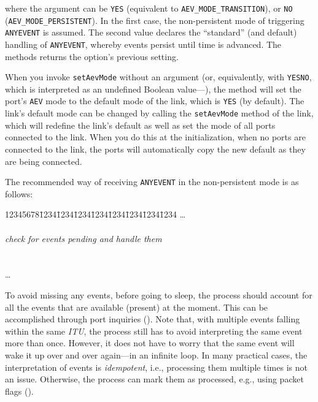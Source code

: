 \noindent
where the argument can be {\tt YES} (equivalent to
{\tt AEV\_MODE\_TRANSITION}), or
{\tt NO} ({\tt AEV\_MODE\_PERSISTENT}).
In the first case, the non-persistent mode of triggering {\tt ANYEVENT} is
assumed.
The second value declares the ``standard'' (and default) handling of
{\tt ANYEVENT}, whereby events persist until time is advanced.
The methods returns the option's previous setting.

When you invoke {\tt setAevMode} without an argument (or, equivalently, with
{\tt YESNO}, which is interpreted as an undefined Boolean
value---), the method
will set the port's {\tt AEV} mode to the default mode of the link, which is
{\tt YES} (by default).
The link's default mode can be changed by calling the {\tt setAevMode} method
of the link, which will redefine the link's default as well as set the mode of
all ports connected to the link.
When you do this at the initialization, when no ports are connected to the
link, the ports will automatically
copy the new default as they are being connected.

The recommended way of receiving {\tt ANYEVENT} in the non-persistent mode
is as follows:

{\tt\begin{tabbing}
12345678\=1234\=1234\=1234\=1234\=1234\=1234\=1234\=1234\kill
\>\ldots \\
 \\
\>\> {\em check for events pending and handle them} \\
\> \\
\>  \\
\> \ldots \\
\end{tabbing}}

\noindent
To avoid missing any events, before going to sleep, the process should account
for all the events that are available (present) at the moment.
This can be accomplished through port inquiries ().
Note that, with multiple events falling within the same {\em ITU}, the process
still has to avoid interpreting the same event more than once.
However, it does not have to worry that the same event will wake it up over and
over again---in an infinite loop.
In many practical cases, the interpretation of events is {\em idempotent},
i.e., processing them multiple times is not an issue.
Otherwise, the process can mark them as processed, e.g., using packet
flags ().


